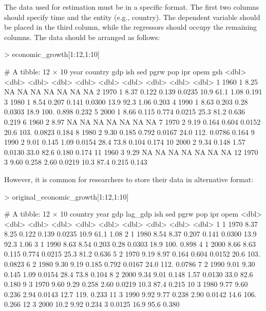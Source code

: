 \documentclass[a4paper]{article}
\begin{document}
The data used for estimation must be in a specific format.
The first two columns should specify time and the entity (e.g., country).
The dependent variable should be placed in the third column, while the regressors should occupy the remaining columns.
The data should be arranged as follows:

\begin{Schunk}
\begin{Sinput}
> economic_growth[1:12,1:10]
\end{Sinput}
\begin{Soutput}
# A tibble: 12 × 10
    year country   gdp    ish    sed    pgrw   pop   ipr    opem    gsh
   <dbl>   <dbl> <dbl>  <dbl>  <dbl>   <dbl> <dbl> <dbl>   <dbl>  <dbl>
 1  1960       1  8.25 NA     NA     NA       NA    NA   NA      NA    
 2  1970       1  8.37  0.122  0.139  0.0235  10.9  61.1  1.08    0.191
 3  1980       1  8.54  0.207  0.141  0.0300  13.9  92.3  1.06    0.203
 4  1990       1  8.63  0.203  0.28   0.0303  18.9 100.   0.898   0.232
 5  2000       1  8.66  0.115  0.774  0.0215  25.3  81.2  0.636   0.219
 6  1960       2  8.97 NA     NA     NA       NA    NA   NA      NA    
 7  1970       2  9.19  0.164  0.604  0.0152  20.6 103.   0.0823  0.184
 8  1980       2  9.30  0.185  0.792  0.0167  24.0 112.   0.0786  0.164
 9  1990       2  9.01  0.145  1.09   0.0154  28.4  73.8  0.104   0.174
10  2000       2  9.34  0.148  1.57   0.0130  33.0  82.6  0.180   0.174
11  1960       3  9.29 NA     NA     NA       NA    NA   NA      NA    
12  1970       3  9.60  0.258  2.60   0.0219  10.3  87.4  0.215   0.143
\end{Soutput}
\end{Schunk}

However, it is common for researchers to store their data in alternative format:

\begin{Schunk}
\begin{Sinput}
> original_economic_growth[1:12,1:10]
\end{Sinput}
\begin{Soutput}
# A tibble: 12 × 10
   country  year   gdp lag_gdp   ish   sed   pgrw   pop   ipr   opem
     <dbl> <dbl> <dbl>   <dbl> <dbl> <dbl>  <dbl> <dbl> <dbl>  <dbl>
 1       1  1970  8.37    8.25 0.122 0.139 0.0235  10.9  61.1 1.08  
 2       1  1980  8.54    8.37 0.207 0.141 0.0300  13.9  92.3 1.06  
 3       1  1990  8.63    8.54 0.203 0.28  0.0303  18.9 100.  0.898 
 4       1  2000  8.66    8.63 0.115 0.774 0.0215  25.3  81.2 0.636 
 5       2  1970  9.19    8.97 0.164 0.604 0.0152  20.6 103.  0.0823
 6       2  1980  9.30    9.19 0.185 0.792 0.0167  24.0 112.  0.0786
 7       2  1990  9.01    9.30 0.145 1.09  0.0154  28.4  73.8 0.104 
 8       2  2000  9.34    9.01 0.148 1.57  0.0130  33.0  82.6 0.180 
 9       3  1970  9.60    9.29 0.258 2.60  0.0219  10.3  87.4 0.215 
10       3  1980  9.77    9.60 0.236 2.94  0.0143  12.7 119.  0.233 
11       3  1990  9.92    9.77 0.238 2.90  0.0142  14.6 106.  0.266 
12       3  2000 10.2     9.92 0.234 3     0.0125  16.9  95.6 0.380 
\end{Soutput}
\end{Schunk}
\end{document}
